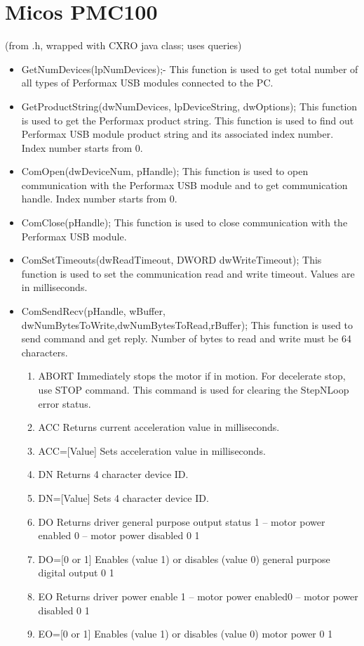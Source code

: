 \documentclass[10pt,letter,twoside]{report}
\begin{document}
\section{Micos PMC100}
(from .h, wrapped with CXRO java class; uses queries)
\begin{itemize}
\item GetNumDevices(lpNumDevices);-	This function is used to get total number of all types of Performax USB modules connected to the PC.
\item GetProductString(dwNumDevices, lpDeviceString,  dwOptions); This function is used to get the Performax product string.  This function is used to find out Performax USB module product string and its associated index number.  Index number starts from 0.
\item ComOpen(dwDeviceNum, pHandle); This function is used to open communication with the Performax USB module and to get communication handle.  Index number starts from 0.  
\item ComClose(pHandle); This function is used to close communication with the Performax USB module.  
\item ComSetTimeouts(dwReadTimeout, DWORD dwWriteTimeout); This function is used to set the communication read and write timeout.  Values are in milliseconds.
\item ComSendRecv(pHandle, wBuffer, dwNumBytesToWrite,dwNumBytesToRead,rBuffer); This function is used to send command and get reply.  Number of bytes to read and write must be 64 characters.
\begin{enumerate}
\item ABORT	Immediately stops the motor if in motion.  For decelerate stop, use STOP command.  This command is used for clearing the StepNLoop error status.
\item ACC	Returns current acceleration value in milliseconds.
\item ACC=[Value]	Sets acceleration value in milliseconds.
\item DN	Returns 4 character device ID.  
\item DN=[Value]	Sets 4 character device ID.  
\item DO	Returns driver general purpose output status	1 – motor power enabled 0 – motor power disabled	0	1
\item DO=[0 or 1]	Enables (value 1) or disables (value 0) general purpose digital output		0	1
\item EO	Returns driver power enable	1 – motor power enabled0 – motor power disabled	0	1
\item EO=[0 or 1]	Enables (value 1) or disables (value 0) motor power		0	1

\end{enumerate}
\end{itemize}
\end{document}
